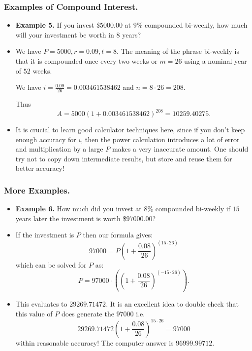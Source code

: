 \begin{frame}%
  \frametitle{Examples of Compound Interest.}
  \begin{itemize}%
\item {\bf Example 5.}
If you invest \$$5000.00$ at $9$\% compounded bi-weekly, how much
will your investment be worth in $8$ years?
\item We have $P=5000, r=0.09, t=8$. The meaning of the phrase bi-weekly
is that it is compounded once every two weeks or $m=26$ using a nominal
year of $52$ weeks.

We have $i=\frac{0.09}{26} = 0.003461538462$ and $n=8\cdot 26 = 208$.

Thus $$A=5000(1+0.003461538462)^{208} = 10259.40275.$$
\item 
{} It is crucial to learn good calculator techniques here,
since if you don't keep enough accuracy for  $i$, then the power
calculation introduces a lot of error and multiplication by a large $P$
makes a very inaccurate amount. One should try not to copy down
intermediate results, but store and reuse them for better accuracy!


\end{itemize}
\end{frame}
%


\begin{frame}%
  \frametitle{ More Examples.}
  \begin{itemize}%

\item {\bf Example 6.}
How much did you invest at $8$\% compounded bi-weekly if $15$ years
later the investment is worth \$$97000.00$?

\item If the investment is $P$ then our formula gives:
$$97000 = P\left(1+\frac{0.08}{26}\right)^{(15\cdot 26)} $$
which can be solved for $P$ as:
$$P = 97000\cdot \left(\left(1+\frac{0.08}{26}\right)^{(-15\cdot 26)}\right).$$
\item
This evaluates to $29269.71472$. It is an excellent idea to double check that
this value of $P$ does generate the $97000$ i.e.
$$29269.71472\left(1+\frac{0.08}{26}\right)^{15\cdot 26} = 97000$$
within reasonable accuracy! The computer answer is $96999.99712$.

\end{itemize}
\end{frame}


